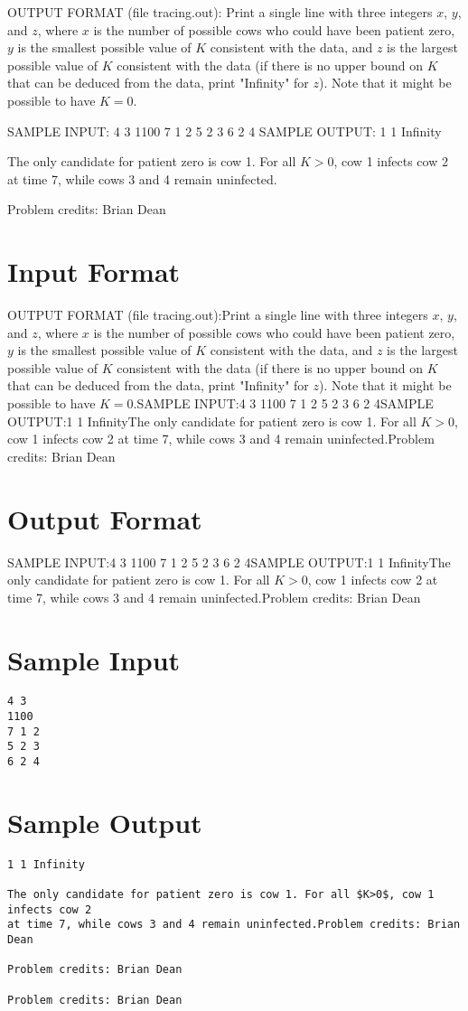 \documentclass[12pt]{article}
\begin{document}
OUTPUT FORMAT (file tracing.out):
Print a single line with three integers $x$, $y$, and $z$, where $x$ is the
number of possible cows who could have been patient zero, $y$ is the smallest
possible value of $K$ consistent with the data, and $z$ is the largest possible
value of $K$ consistent with the data (if there is no upper bound on $K$ that
can be deduced from the data, print "Infinity" for $z$). Note that it might be
possible to have $K=0$.

SAMPLE INPUT:
4 3
1100
7 1 2
5 2 3
6 2 4
SAMPLE OUTPUT: 
1 1 Infinity

The only candidate for patient zero is cow 1. For all $K>0$, cow 1 infects cow 2
at time 7, while cows 3 and 4 remain uninfected.


Problem credits: Brian Dean



\section*{Input Format}
OUTPUT FORMAT (file tracing.out):Print a single line with three integers $x$, $y$, and $z$, where $x$ is the
number of possible cows who could have been patient zero, $y$ is the smallest
possible value of $K$ consistent with the data, and $z$ is the largest possible
value of $K$ consistent with the data (if there is no upper bound on $K$ that
can be deduced from the data, print "Infinity" for $z$). Note that it might be
possible to have $K=0$.SAMPLE INPUT:4 3
1100
7 1 2
5 2 3
6 2 4SAMPLE OUTPUT:1 1 InfinityThe only candidate for patient zero is cow 1. For all $K>0$, cow 1 infects cow 2
at time 7, while cows 3 and 4 remain uninfected.Problem credits: Brian Dean

\section*{Output Format}
SAMPLE INPUT:4 3
1100
7 1 2
5 2 3
6 2 4SAMPLE OUTPUT:1 1 InfinityThe only candidate for patient zero is cow 1. For all $K>0$, cow 1 infects cow 2
at time 7, while cows 3 and 4 remain uninfected.Problem credits: Brian Dean

\section*{Sample Input}
\begin{verbatim}
4 3
1100
7 1 2
5 2 3
6 2 4
\end{verbatim}

\section*{Sample Output}
\begin{verbatim}
1 1 Infinity

The only candidate for patient zero is cow 1. For all $K>0$, cow 1 infects cow 2
at time 7, while cows 3 and 4 remain uninfected.Problem credits: Brian Dean

Problem credits: Brian Dean

Problem credits: Brian Dean
\end{verbatim}
\end{document}
